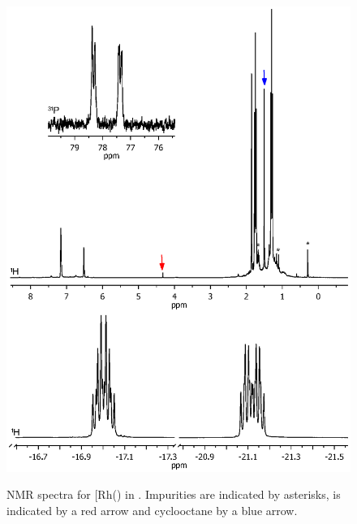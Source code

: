 
\begin{figure}[htbp]
\begin{center}
\vspace{0.5cm}
\includegraphics[trim = 2.5cm 8.5cm 2.5cm 0cm, clip]{../NMR/7006E.eps}
\caption[NMR spectra for [Rh(\tButhixantphos)\ce{Cl(H)2]}]{NMR spectra for \texorpdfstring{[Rh(\tButhixantphos)\ce{Cl(H)2]}} R in .  Impurities are indicated by asterisks,  is indicated by a red arrow and cyclooctane by a blue arrow.}
\vspace{0.2cm}
\label{rhodiumhydridenmr}
\end{center}
\end{figure}
\vspace{0.2cm}

